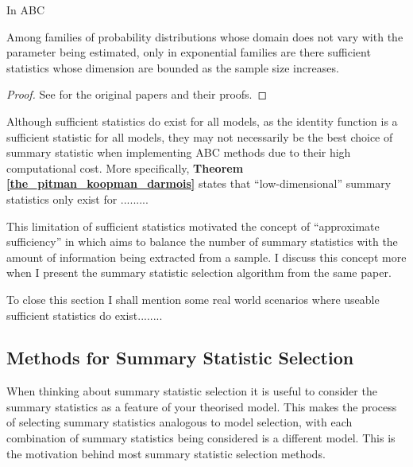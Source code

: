 \documentclass[11pt,a4paper,margin=0]{article}
\theoremstyle{break}
\begin{document}
  \par In ABC


  \begin{box_theorem}\label{the_pitman_koopman_darmois}
    Among families of probability distributions whose domain does not vary with the parameter being estimated, only in exponential families are there sufficient statistics whose dimension are bounded as the sample size increases.
    \begin{proof}
      See \cite[]{pkd_theorem_darmois_part,pkd_theorem_pitman_part,pkd_theorem_koopman_part} for the original papers and their proofs.
    \end{proof}
  \end{box_theorem}

  \par Although sufficient statistics do exist for all models, as the identity function is a sufficient statistic for all models, they may not necessarily be the best choice of summary statistic when implementing ABC methods due to their high computational cost. More specifically, \textbf{Theorem \ref{the_pitman_koopman_darmois}} states that ``low-dimensional'' summary statistics only exist for .........

  \par This limitation of sufficient statistics motivated the concept of ``approximate sufficiency'' in \cite{Approximately_sufficient_statistics_and_bayesian_computation} which aims to balance the number of summary statistics with the amount of information being extracted from a sample. I discuss this concept more when I present the summary statistic selection algorithm from the same paper.

  To close this section I shall mention some real world scenarios where useable sufficient statistics do exist........


\subsection{Methods for Summary Statistic Selection}\label{sec_summary_stats_methods}

  \par When thinking about summary statistic selection it is useful to consider the summary statistics as a feature of your theorised model. This makes the process of selecting summary statistics analogous to model selection, with each combination of summary statistics being considered is a different model. This is the motivation behind most summary statistic selection methods.
\end{document}
